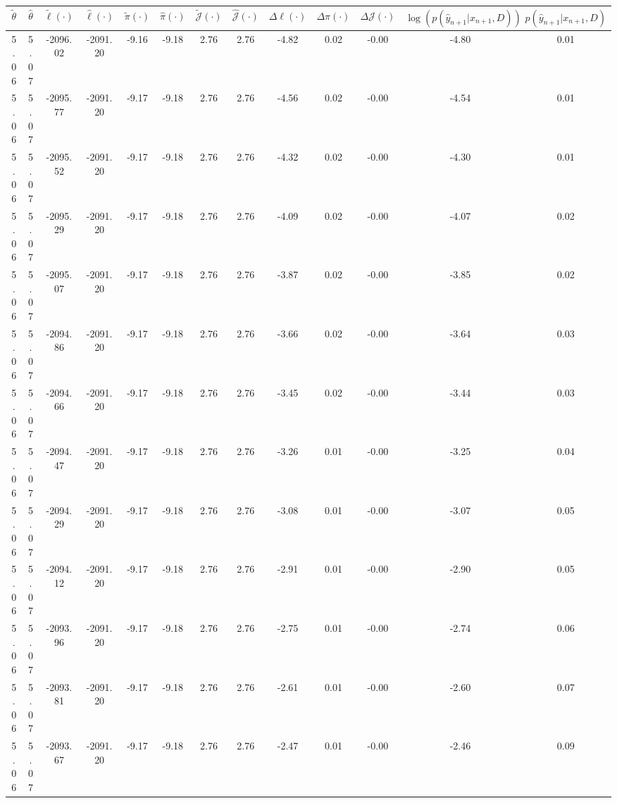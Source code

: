 \begin{table}[htbp]
        \centering
        \tiny
        \begin{adjustbox}{angle=90}
            \begin{tabular}{|c|c|c|c|c|c|c|c|c|c|c|c|c|}
                \hline
                 $\tilde{\theta}$ & $\hat{\theta}$ & $\tilde{\ell}(\cdot)$ & $\hat{\ell}(\cdot)$ & $\tilde{\pi}(\cdot)$ & $\hat{\pi}(\cdot)$ & $\tilde{\mathcal{J}}(\cdot)$ & $\hat{\mathcal{J}}(\cdot)$ & $\Delta \ell(\cdot)$ & $\Delta \pi(\cdot)$ & $\Delta \mathcal{J}(\cdot)$ & $\log(p(\hat{y}_{n+1}|x_{n+1}, D))$ & $p(\hat{y}_{n+1}|x_{n+1}, D)$ \\
                \hline
                 5.06 & 5.07 & -2096.02 & -2091.20 & -9.16 & -9.18 & 2.76 & 2.76 & -4.82 & 0.02 & -0.00 & -4.80 & 0.01\\ \hline
 5.06 & 5.07 & -2095.77 & -2091.20 & -9.17 & -9.18 & 2.76 & 2.76 & -4.56 & 0.02 & -0.00 & -4.54 & 0.01\\ \hline
 5.06 & 5.07 & -2095.52 & -2091.20 & -9.17 & -9.18 & 2.76 & 2.76 & -4.32 & 0.02 & -0.00 & -4.30 & 0.01\\ \hline
 5.06 & 5.07 & -2095.29 & -2091.20 & -9.17 & -9.18 & 2.76 & 2.76 & -4.09 & 0.02 & -0.00 & -4.07 & 0.02\\ \hline
 5.06 & 5.07 & -2095.07 & -2091.20 & -9.17 & -9.18 & 2.76 & 2.76 & -3.87 & 0.02 & -0.00 & -3.85 & 0.02\\ \hline
 5.06 & 5.07 & -2094.86 & -2091.20 & -9.17 & -9.18 & 2.76 & 2.76 & -3.66 & 0.02 & -0.00 & -3.64 & 0.03\\ \hline
 5.06 & 5.07 & -2094.66 & -2091.20 & -9.17 & -9.18 & 2.76 & 2.76 & -3.45 & 0.02 & -0.00 & -3.44 & 0.03\\ \hline
 5.06 & 5.07 & -2094.47 & -2091.20 & -9.17 & -9.18 & 2.76 & 2.76 & -3.26 & 0.01 & -0.00 & -3.25 & 0.04\\ \hline
 5.06 & 5.07 & -2094.29 & -2091.20 & -9.17 & -9.18 & 2.76 & 2.76 & -3.08 & 0.01 & -0.00 & -3.07 & 0.05\\ \hline
 5.06 & 5.07 & -2094.12 & -2091.20 & -9.17 & -9.18 & 2.76 & 2.76 & -2.91 & 0.01 & -0.00 & -2.90 & 0.05\\ \hline
 5.06 & 5.07 & -2093.96 & -2091.20 & -9.17 & -9.18 & 2.76 & 2.76 & -2.75 & 0.01 & -0.00 & -2.74 & 0.06\\ \hline
 5.06 & 5.07 & -2093.81 & -2091.20 & -9.17 & -9.18 & 2.76 & 2.76 & -2.61 & 0.01 & -0.00 & -2.60 & 0.07\\ \hline
 5.06 & 5.07 & -2093.67 & -2091.20 & -9.17 & -9.18 & 2.76 & 2.76 & -2.47 & 0.01 & -0.00 & -2.46 & 0.09\\ \hline

\end{tabular}
\end{adjustbox}
\end{table}
